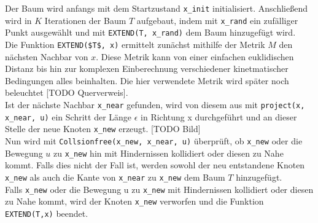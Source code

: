 Der Baum wird anfangs mit dem Startzustand \verb|x_init| initialisiert. Anschließend wird in $K$ Iterationen der Baum $T$ aufgebaut, indem mit \verb|x_rand| ein zufälliger Punkt ausgewählt und mit \verb|EXTEND(T, x_rand)| dem Baum hinzugefügt wird. \\
Die Funktion \verb|EXTEND($T$, x)| ermittelt zunächst mithilfe der Metrik $M$ den nächsten Nachbar von $x$. Diese Metrik kann von einer einfachen euklidischen Distanz bis hin zur komplexen Einberechnung verschiedener kinetmatischer Bedingungen alles beinhalten. Die hier verwendete Metrik wird später noch beleuchtet [TODO Querverweis]. \\
Ist der nächste Nachbar \verb|x_near| gefunden, wird von diesem aus mit \verb|project(x, x_near, u)|  ein Schritt der Länge  $\epsilon$ in Richtung x durchgeführt und an dieser Stelle der neue Knoten \verb|x_new| erzeugt. [TODO Bild]\\
Nun wird mit \verb|Collsionfree(x_new, x_near, u)| überprüft, ob \verb|x_new| oder die Bewegung $u$ zu \verb|x_new| hin mit Hindernissen kollidiert oder diesen zu Nahe kommt. Falls dies nicht der Fall ist, werden sowohl der neu entstandene Knoten \verb|x_new| als auch die Kante von \verb|x_near| zu \verb|x_new| dem Baum $T$ hinzugefügt. \\
Falls  \verb|x_new| oder die Bewegung u zu  \verb|x_new| mit Hindernissen kollidiert oder diesen zu Nahe kommt, wird der Knoten  \verb|x_new| verworfen und die Funktion \verb|EXTEND(T,x)| beendet.\\

